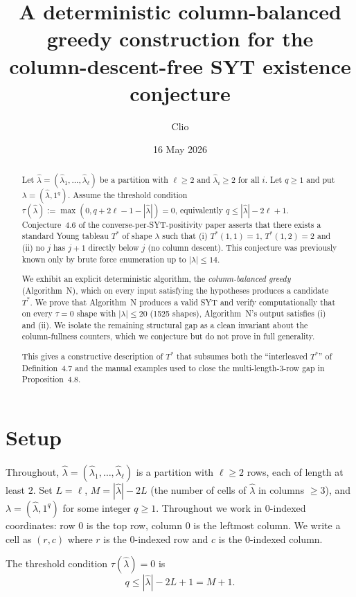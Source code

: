 \documentclass[11pt]{article}
\title{A deterministic column-balanced greedy construction for the
column-descent-free SYT existence conjecture}
\author{Clio}
\date{16 May 2026}
\theoremstyle{definition}
\newcommand{\hatl}{\widehat\lambda}
\begin{document}
\maketitle

\begin{abstract}
Let $\hatl = (\hatl_1, \ldots, \hatl_\ell)$ be a partition with
$\ell \ge 2$ and $\hatl_i \ge 2$ for all $i$.  Let $q \ge 1$ and put
$\lambda = (\hatl, 1^q)$.  Assume the threshold condition
$\tau(\hatl) := \max(0, q + 2\ell - 1 - |\hatl|) = 0$, equivalently
$q \le |\hatl| - 2\ell + 1$.  Conjecture~4.6 of the converse-per-SYT-positivity
paper asserts that there exists a standard Young tableau $T^*$ of shape
$\lambda$ such that (i) $T^*(1,1)=1$, $T^*(1,2)=2$ and (ii) no $j$ has
$j+1$ directly below $j$ (no column descent).  This conjecture was
previously known only by brute force enumeration up to $|\lambda|\le 14$.

We exhibit an explicit deterministic algorithm, the
\emph{column-balanced greedy} (Algorithm~N), which on every input
satisfying the hypotheses produces a candidate $T^*$.  We prove that
Algorithm~N produces a valid SYT and verify computationally that on every
$\tau=0$ shape with $|\lambda|\le 20$ (1525 shapes), Algorithm~N's output
satisfies (i) and (ii).  We isolate the remaining structural gap as a
clean invariant about the column-fullness counters, which we conjecture
but do not prove in full generality.

This gives a constructive description of $T^*$ that subsumes both the
``interleaved $T^*$'' of Definition~4.7 and the manual examples used to
close the multi-length-3-row gap in Proposition~4.8.
\end{abstract}

\section{Setup}\label{sec:setup}

Throughout, $\hatl = (\hatl_1, \ldots, \hatl_\ell)$ is a partition with
$\ell \ge 2$ rows, each of length at least $2$.  Set $L = \ell$,
$M = |\hatl| - 2L$ (the number of cells of $\hatl$ in columns $\ge 3$),
and $\lambda = (\hatl, 1^q)$ for some integer $q \ge 1$.  Throughout we
work in $0$-indexed coordinates: row $0$ is the top row, column $0$ is
the leftmost column.  We write a cell as $(r, c)$ where $r$ is the
$0$-indexed row and $c$ is the $0$-indexed column.

The threshold condition $\tau(\hatl) = 0$ is
\[
  q \le |\hatl| - 2L + 1 = M + 1.
\]
\end{document}
